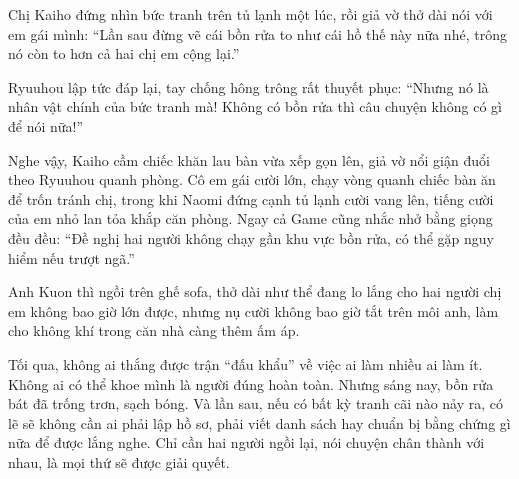 \documentclass[../main.tex]{subfiles}
\begin{document}
Chị Kaiho đứng nhìn bức tranh trên tủ lạnh một lúc, rồi giả vờ thở dài nói với em gái mình: ``Lần sau đừng vẽ cái bồn rửa to như cái hồ thế này nữa nhé, trông nó còn to hơn cả hai chị em cộng lại.''

Ryuuhou lập tức đáp lại, tay chống hông trông rất thuyết phục: ``Nhưng nó là nhân vật chính của bức tranh mà! Không có bồn rửa thì câu chuyện không có gì để nói nữa!''

Nghe vậy, Kaiho cầm chiếc khăn lau bàn vừa xếp gọn lên, giả vờ nổi giận đuổi theo Ryuuhou quanh phòng. Cô em gái cười lớn, chạy vòng quanh chiếc bàn ăn để trốn tránh chị, trong khi Naomi đứng cạnh tủ lạnh cười vang lên, tiếng cười của em nhỏ lan tỏa khắp căn phòng.  Ngay cả Game cũng nhắc nhở bằng giọng đều đều: ``Đề nghị hai người không chạy gần khu vực bồn rửa, có thể gặp nguy hiểm nếu trượt ngã.''

Anh Kuon thì ngồi trên ghế sofa, thở dài như thể đang lo lắng cho hai người chị em không bao giờ lớn được, nhưng nụ cười không bao giờ tắt trên môi anh, làm cho không khí trong căn nhà càng thêm ấm áp.

Tối qua, không ai thắng được trận ``đấu khẩu'' về việc ai làm nhiều ai làm ít. Không ai có thể khoe mình là người đúng hoàn toàn. Nhưng sáng nay, bồn rửa bát đã trống trơn, sạch bóng. Và lần sau, nếu có bất kỳ tranh cãi nào nảy ra, có lẽ sẽ không cần ai phải lập hồ sơ, phải viết danh sách hay chuẩn bị bằng chứng gì nữa để được lắng nghe. Chỉ cần hai người ngồi lại, nói chuyện chân thành với nhau, là mọi thứ sẽ được giải quyết.
\end{document}
